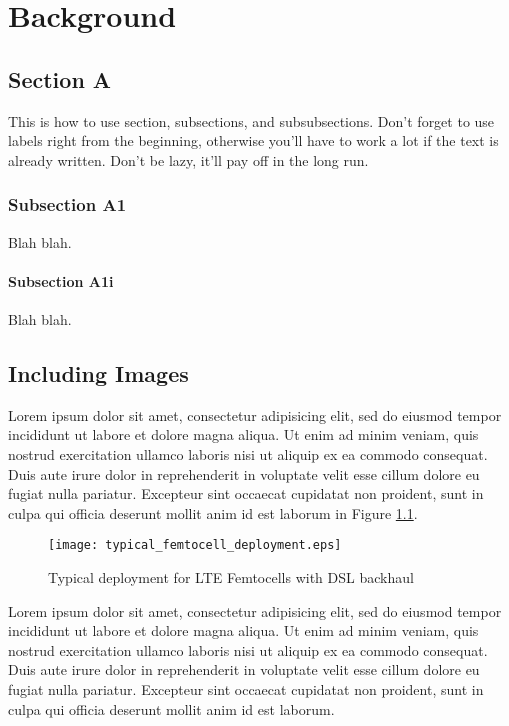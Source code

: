 
\chapter{Background}
\label{cha:background}

\section{Section A}
\label{sec:section_a}
This is how to use section, subsections, and subsubsections. Don't forget to use labels right from the beginning, otherwise you'll have to work a lot if the text is already written. Don't be lazy, it'll pay off in the long run.
\subsection{Subsection A1}
\label{sub:subsection_a1}
Blah blah.
\subsubsection{Subsection A1i}
\label{ssub:subsection_a1i}
Blah blah.



\section{Including Images}
\label{sec:images}

Lorem ipsum dolor sit amet, consectetur adipisicing elit, sed do eiusmod
tempor incididunt ut labore et dolore magna aliqua. Ut enim ad minim veniam,
quis nostrud exercitation ullamco laboris nisi ut aliquip ex ea commodo
consequat. Duis aute irure dolor in reprehenderit in voluptate velit esse
cillum dolore eu fugiat nulla pariatur. Excepteur sint occaecat cupidatat non
proident, sunt in culpa qui officia deserunt mollit anim id est laborum in Figure \ref{fig:femto_over_DSL_deployment}.

\begin{figure}[h!]
\centering
\texttt{[image: typical\_femtocell\_deployment.eps]}
\caption{Typical deployment for LTE Femtocells with DSL backhaul}
\label{fig:femto_over_DSL_deployment}
\end{figure}

Lorem ipsum dolor sit amet, consectetur adipisicing elit, sed do eiusmod
tempor incididunt ut labore et dolore magna aliqua. Ut enim ad minim veniam,
quis nostrud exercitation ullamco laboris nisi ut aliquip ex ea commodo
consequat. Duis aute irure dolor in reprehenderit in voluptate velit esse
cillum dolore eu fugiat nulla pariatur. Excepteur sint occaecat cupidatat non
proident, sunt in culpa qui officia deserunt mollit anim id est laborum.

